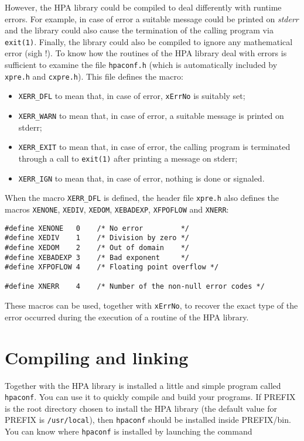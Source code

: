 \documentclass{article}
\begin{document}
However, the HPA library could be compiled to deal differently with
runtime errors.
For example, in case of error a suitable message could be
printed on \textit{stderr} and the library could also cause the
termination of the calling program via \texttt{exit(1)}.
Finally, the library could also be compiled to ignore
any mathematical error (sigh !). To know how the routines of
the HPA library deal with errors is sufficient to examine the file
\texttt{hpaconf.h} (which is automatically included by \texttt{xpre.h} and
\texttt{cxpre.h}). This file defines the macro:

\begin{itemize}
\item \texttt{XERR\_DFL}   to mean that, in case of error, 
\texttt{xErrNo} is suitably set;
\item \texttt{XERR\_WARN}  to mean that, in case of error, 
a suitable message is printed on stderr;
\item \texttt{XERR\_EXIT}  to mean that, in case of error, 
the calling program is terminated
through a call to \texttt{exit(1)} after
printing a message on stderr;
\item \texttt{XERR\_IGN}  to mean that, in case of error, 
nothing is done or signaled.
\end{itemize}

When the macro \texttt{XERR\_DFL} is defined, the header file \texttt{xpre.h}
also defines the macros \texttt{XENONE}, \texttt{XEDIV}, \texttt{XEDOM},
\texttt{XEBADEXP}, \texttt{XFPOFLOW} and \texttt{XNERR}:

\begin{verbatim}
#define XENONE   0    /* No error         */
#define XEDIV    1    /* Division by zero */
#define XEDOM    2    /* Out of domain    */
#define XEBADEXP 3    /* Bad exponent     */
#define XFPOFLOW 4    /* Floating point overflow */

#define XNERR    4    /* Number of the non-null error codes */
\end{verbatim}
These macros can be used, together with \texttt{xErrNo}, to recover the exact 
type of the error occurred during the execution of a routine 
of the HPA library.


\hypertarget{comp_link}{}
\section{Compiling and linking}
Together with the HPA library is installed a little and simple
program called \texttt{hpaconf}. 
You can use it to quickly compile and build your programs.
If PREFIX is the root directory chosen to install the HPA library
(the default value for PREFIX is \texttt{/usr/local}), then \texttt{hpaconf}
should be installed inside PREFIX/bin. You can know where \texttt{hpaconf}
is installed by launching the command
\end{document}
